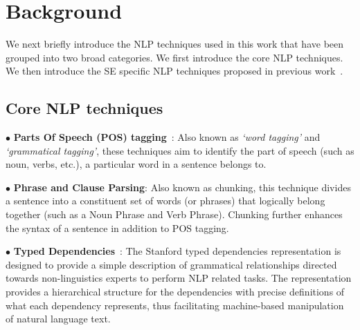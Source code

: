 \section{Background}
\label{sec:background}

We next briefly introduce the NLP techniques used in this work that have been grouped into two broad categories.
We first introduce the core NLP techniques.
We then introduce the SE specific NLP techniques proposed in previous work~\cite{pandita12:inferring,pandita13:WHYPER}.

\subsection{Core NLP techniques}
\label{sub:CoreNLPback}



{\small $\bullet$} \textbf{Parts Of Speech (POS) tagging}~\cite{Klein03,KleinNIPS03}: Also known as \textit{`word tagging'} and \textit{`grammatical tagging'}, these techniques aim to identify the part of speech (such as noun, verbs, etc.), a particular word in a sentence belongs to.

{\small $\bullet$} \textbf{Phrase and Clause Parsing}: Also known as chunking, this technique divides a sentence into a constituent set of words (or phrases) that logically belong together (such as a Noun Phrase and Verb Phrase). Chunking further enhances the syntax of a sentence in addition to POS tagging.

{\small $\bullet$} \textbf{Typed Dependencies}~\cite{Marneffe06LREC,Marneffe08COLING}: The Stanford typed dependencies representation is designed to provide a simple description of grammatical relationships directed towards non-linguistics experts to perform NLP related tasks. The representation provides a hierarchical structure for the dependencies with precise definitions of what each dependency represents, thus facilitating machine-based manipulation of natural language text.


